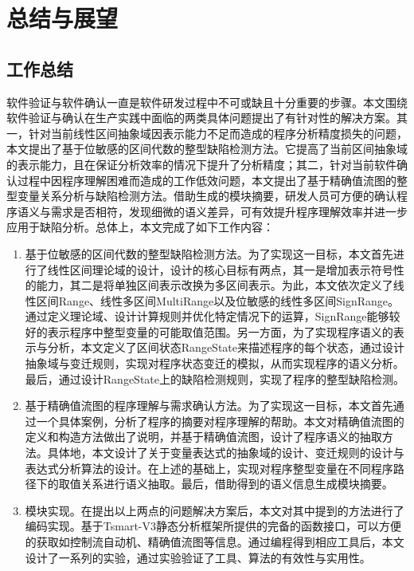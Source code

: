 
\chapter{总结与展望}

\section{工作总结}

软件验证与软件确认一直是软件研发过程中不可或缺且十分重要的步骤。本文围绕软件验证与确认在生产实践中面临的两类具体问题提出了有针对性的解决方案。其一，针对当前线性区间抽象域因表示能力不足而造成的程序分析精度损失的问题，本文提出了基于位敏感的区间代数的整型缺陷检测方法。它提高了当前区间抽象域的表示能力，且在保证分析效率的情况下提升了分析精度；其二，针对当前软件确认过程中因程序理解困难而造成的工作低效问题，本文提出了基于精确值流图的整型变量关系分析与缺陷检测方法。借助生成的模块摘要，研发人员可方便的确认程序语义与需求是否相符，发现细微的语义差异，可有效提升程序理解效率并进一步应用于缺陷分析。总体上，本文完成了如下工作内容：

\begin{enumerate}
	\item 基于位敏感的区间代数的整型缺陷检测方法。为了实现这一目标，本文首先进行了线性区间理论域的设计，设计的核心目标有两点，其一是增加表示符号性的能力，其二是将单独区间表示改换为多区间表示。为此，本文依次定义了线性区间Range、线性多区间MultiRange以及位敏感的线性多区间SignRange。通过定义理论域、设计计算规则并优化特定情况下的运算，SignRange能够较好的表示程序中整型变量的可能取值范围。另一方面，为了实现程序语义的表示与分析，本文定义了区间状态RangeState来描述程序的每个状态，通过设计抽象域与变迁规则，实现对程序状态变迁的模拟，从而实现程序的语义分析。最后，通过设计RangeState上的缺陷检测规则，实现了程序的整型缺陷检测。
	
	\item 基于精确值流图的程序理解与需求确认方法。为了实现这一目标，本文首先通过一个具体案例，分析了程序的摘要对程序理解的帮助。本文对精确值流图的定义和构造方法做出了说明，并基于精确值流图，设计了程序语义的抽取方法。具体地，本文设计了关于变量表达式的抽象域的设计、变迁规则的设计与表达式分析算法的设计。在上述的基础上，实现对程序整型变量在不同程序路径下的取值关系进行语义抽取。最后，借助得到的语义信息生成模块摘要。
	
	\item 模块实现。在提出以上两点的问题解决方案后，本文对其中提到的方法进行了编码实现。基于Tsmart-V3静态分析框架所提供的完备的函数接口，可以方便的获取如控制流自动机、精确值流图等信息。通过编程得到相应工具后，本文设计了一系列的实验，通过实验验证了工具、算法的有效性与实用性。
\end{enumerate}

